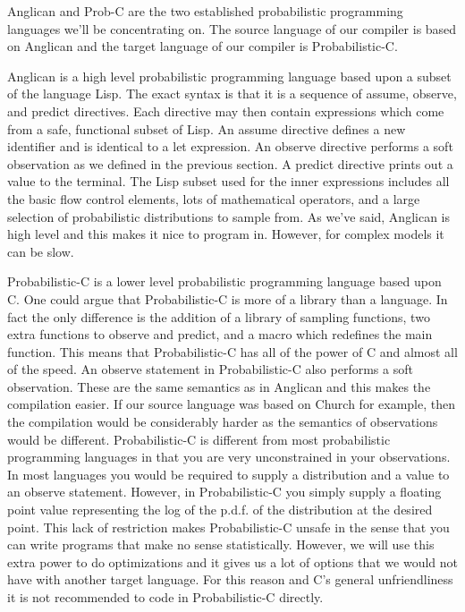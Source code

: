 \documentclass[a4paper]{article}
\begin{document}
Anglican and Prob-C are the two established probabilistic programming languages we'll be concentrating on. The source language of our compiler is based on Anglican and the target language of our compiler is Probabilistic-C.

Anglican is a high level probabilistic programming language based upon a subset of the language Lisp. The exact syntax is that it is a sequence of assume, observe, and predict directives. Each directive may then contain expressions which come from a safe, functional subset of Lisp. An assume directive defines a new identifier and is identical to a let expression. An observe directive performs a soft observation as we defined in the previous section. A predict directive prints out a value to the terminal. The Lisp subset used for the inner expressions includes all the basic flow control elements, lots of mathematical operators, and a large selection of probabilistic distributions to sample from. As we've said, Anglican is high level and this makes it nice to program in. However, for complex models it can be slow.

Probabilistic-C is a lower level probabilistic programming language based upon C. One could argue that Probabilistic-C is more of a library than a language. In fact the only difference is the addition of a library of sampling functions, two extra functions to observe and predict, and a macro which redefines the main function. This means that Probabilistic-C has all of the power of C and almost all of the speed. An observe statement in Probabilistic-C also performs a soft observation. These are the same semantics as in Anglican and this makes the compilation easier. If our source language was based on Church for example, then the compilation would be considerably harder as the semantics of observations would be different. Probabilistic-C is different from most probabilistic programming languages in that you are very unconstrained in your observations. In most languages you would be required to supply a distribution and a value to an observe statement. However, in Probabilistic-C you simply supply a floating point value representing the log of the p.d.f. of the distribution at the desired point. This lack of restriction makes Probabilistic-C unsafe in the sense that you can write programs that make no sense statistically. However, we will use this extra power to do optimizations and it gives us a lot of options that we would not have with another target language. For this reason and C's general unfriendliness it is not recommended to code in Probabilistic-C directly.
\end{document}
